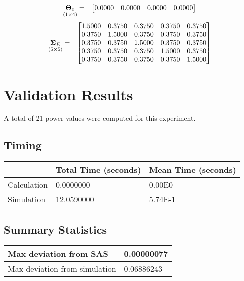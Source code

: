 \documentclass{glimmpse-report}
\begin{document}
\begin{eqnarray*}
\underset{\left(1\times4\right)}{\mathbf{\Theta}_0} & = & \begin{bmatrix}0.0000 & 0.0000 & 0.0000 & 0.0000\protect\\
\end{bmatrix}
\end{eqnarray*}
\begin{eqnarray*}
\underset{\left(5\times5\right)}{\mathbf{\Sigma}_E} & = & \begin{bmatrix}1.5000 & 0.3750 & 0.3750 & 0.3750 & 0.3750\protect\\
0.3750 & 1.5000 & 0.3750 & 0.3750 & 0.3750\protect\\
0.3750 & 0.3750 & 1.5000 & 0.3750 & 0.3750\protect\\
0.3750 & 0.3750 & 0.3750 & 1.5000 & 0.3750\protect\\
0.3750 & 0.3750 & 0.3750 & 0.3750 & 1.5000\protect\\
\end{bmatrix}
\end{eqnarray*}
\section{Validation Results}
A total of 21 power values were computed for this experiment.

\subsection{Timing}
\begin{tabular}{|l|l|l|}
\hline
 & Total Time (seconds) & Mean Time (seconds) \\ 
\hline
Calculation & 0.0000000 & 0.00E0\tabularnewline
\hline
Simulation & 12.0590000 & 5.74E-1\tabularnewline
\hline
\end{tabular}
\subsection{Summary Statistics}
\begin{tabular}{|l|l|}
\hline
Max deviation from SAS & 0.00000077\tabularnewline
\hline

Max deviation from simulation & 0.06886243\tabularnewline
\hline

\end{tabular}
\end{document}
